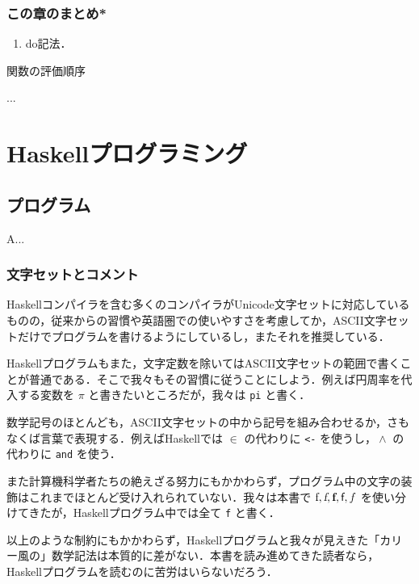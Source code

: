 \documentclass[a4paper,twocolumn]{jsbook}
\newcommand{\programminglanguage}[1]{\textsf{#1}}
\newcommand{\haskell}{\programminglanguage{Haskell}}
\newenvironment{leader}{\begingroup\gt}{\endgroup}
\newenvironment{note}[1]{\begin{boxnote}\begin{center}#1\end{center}}{\end{boxnote}}
\newcommand{\code}[1]{\texttt{#1}}
\DeclareMathOperator{\mFrom}{\in}
\DeclareMathOperator{\mLogicalAnd}{\wedge}
\begin{document}
\section{この章のまとめ*}

\begin{enumerate}
\item do記法．
\end{enumerate}

\begin{note}{関数の評価順序}
...
\end{note}


\part{\haskell プログラミング}

\chapter{プログラム}

\begin{leader}
A...
\end{leader}


\section{文字セットとコメント}

\haskell コンパイラを含む多くのコンパイラがUnicode文字セットに対応しているものの，従来からの習慣や英語圏での使いやすさを考慮してか，ASCII文字セットだけでプログラムを書けるようにしているし，またそれを推奨している．

\haskell プログラムもまた，文字定数を除いてはASCII文字セットの範囲で書くことが普通である．そこで我々もその習慣に従うことにしよう．例えば円周率を代入する変数を $\pi$ と書きたいところだが，我々は \code{pi} と書く．

数学記号のほとんども，ASCII文字セットの中から記号を組み合わせるか，さもなくば言葉で表現する．例えば\haskell では $\mFrom$ の代わりに \code{<-} を使うし，$\mLogicalAnd$ の代わりに \code{and} を使う．

また計算機科学者たちの絶えざる努力にもかかわらず，プログラム中の文字の装飾はこれまでほとんど受け入れられていない．我々は本書で $\textrm{f},\textsl{f},\textbf{f},\textsf{f},f$ を使い分けてきたが，\haskell プログラム中では全て \code{f} と書く．

以上のような制約にもかかわらず，\haskell プログラムと我々が見えきた「カリー風の」数学記法は本質的に差がない．本書を読み進めてきた読者なら，\haskell プログラムを読むのに苦労はいらないだろう．
\end{document}

